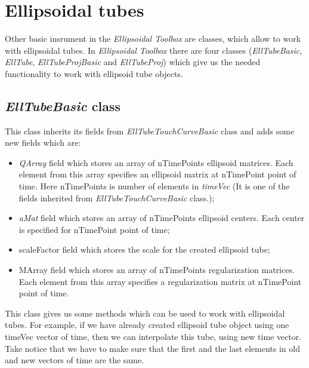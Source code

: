 \documentclass[letterpaper,10pt,english]{sphinxmanual}
\begin{document}
\section{Ellipsoidal tubes}
\label{chap_ellTube:ellipsoidal-tubes}
Other basic insrument in the \emph{Ellipsoidal Toolbox} are classes, which allow to work with ellipsoidal tubes. In \emph{Ellipsoidal Toolbox} there are four classes (\emph{EllTubeBasic}, \emph{EllTube}, \emph{EllTubeProjBasic} and \emph{EllTubeProj}) which give us the needed functionality to work with ellipsoid tube objects.


\subsection{\emph{EllTubeBasic} class}
\label{chap_ellTube:elltubebasic-class}
This class inherits its fields from \emph{EllTubeTouchCurveBasic} class and adds some new fields which are:
\begin{itemize}
\item {} 
\emph{QArray} field which stores an array of nTimePoints ellipsoid matrices. Each element from this
array specifies an ellipsoid matrix at nTimePoint point of time. Here nTimePoints is number of    elements in \emph{timeVec} (It is one of the fields inherited from \emph{EllTubeTouchCurveBasic}       class.);

\item {} 
\emph{aMat} field which stores an array of nTimePoints ellipsoid centers. Each center is specified     for nTimePoint point of time;

\item {} 
scaleFactor field which stores the scale for the created ellipsoid tube;

\item {} 
MArray field which stores an array of nTimePoints regularization matrices. Each element from      this array specifies a regularization matrix at nTimePoint point of time.

\end{itemize}

This class gives us some methods which can be used to work with ellipsoidal tubes. For example, if we have already created ellipsoid tube object using one timeVec vector of time, then we can interpolate this tube, using new time vector. Take notice that we have to make sure that the first and the last elements in old and new vectors of time are the same.
\end{document}
